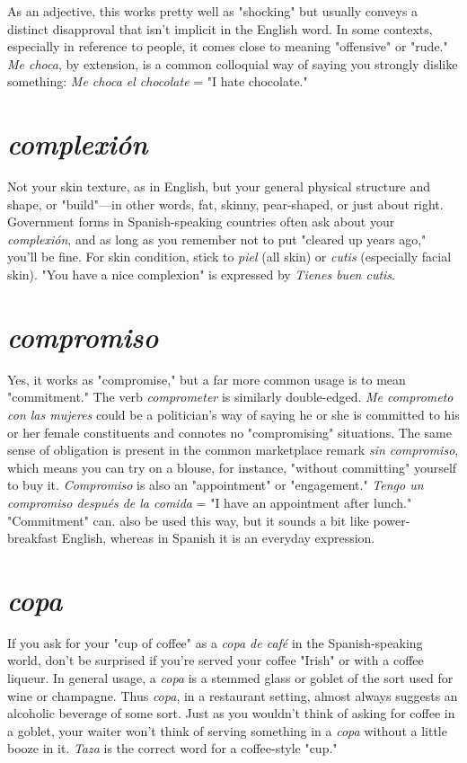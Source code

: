 \documentclass[14pt,a4paper,oneside]{memoir}
\begin{document}
As an adjective, this works pretty well as
"shocking" but usually conveys a distinct disapproval that isn't implicit in the English word. In some contexts, especially in reference to
people, it comes close to meaning "offensive" or "rude." \emph{Me choca}, by
extension, is a common colloquial way of saying you strongly dislike
something: \emph{Me choca el chocolate} = "I hate chocolate."

\section{\emph{complexión}}

Not your skin texture, as in English, but your
general physical structure and shape, or "build"---in other words, fat,
skinny, pear-shaped, or just about right. Government forms in Spanish-speaking countries often ask about your \emph{complexión}, and as long as
you remember not to put "cleared up years ago," you'll be fine. For
skin condition, stick to \emph{piel} (all skin) or \emph{cutis} (especially facial skin).
"You have a nice complexion" is expressed by \emph{Tienes buen cutis}.

\section{\emph{compromiso}}

Yes, it works as "compromise," but a far more
common usage is to mean "commitment." The verb \emph{comprometer} is
similarly double-edged. \emph{Me comprometo con las mujeres} could be a
politician's way of saying he or she is committed to his or her female
constituents and connotes no "compromising" situations. The same
sense of obligation is present in the common marketplace remark
\emph{sin compromiso}, which means you can try on a blouse, for instance,
"without committing" yourself to buy it. \emph{Compromiso} is also an
"appointment" or "engagement." \emph{Tengo un compromiso después de la
comida} = "I have an appointment after lunch." "Commitment" can.
also be used this way, but it sounds a bit like power-breakfast English,
whereas in Spanish it is an everyday expression.

\section{\emph{copa}}

If you ask for your "cup of coffee" as a \emph{copa de café} in
the Spanish-speaking world, don't be surprised if you're served your
coffee "Irish" or with a coffee liqueur. In general usage, a \emph{copa} is a
stemmed glass or goblet of the sort used for wine or champagne. Thus
\emph{copa}, in a restaurant setting, almost always suggests an alcoholic beverage of some sort. Just as you wouldn't think of asking for coffee in a
goblet, your waiter won't think of serving something in a \emph{copa} without
a little booze in it. \emph{Taza} is the correct word for a coffee-style "cup."
\end{document}
